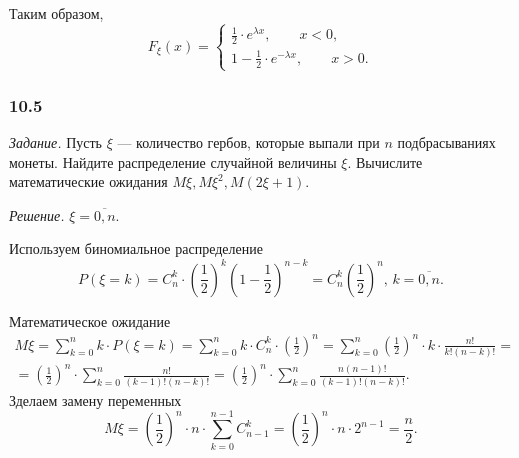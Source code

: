 Таким образом,
$$F_{ \xi } \left( x \right) =
\begin{cases}
\frac{1}{2} \cdot e^{ \lambda x}, \qquad x < 0, \\
1 - \frac{1}{2} \cdot e^{- \lambda x}, \qquad x > 0.
\end{cases}$$

\subsubsection*{10.5}

\textit{Задание.} Пусть $ \xi $ --- количество гербов, которые выпали при $n$ подбрасываниях монеты.
Найдите распределение случайной величины $ \xi $.
Вычислите математические ожидания $M \xi, M \xi^2, M \left( 2 \xi + 1 \right) $.

\textit{Решение.} $ \xi = \overline{0, n}$.

Используем биномиальное распределение
$$P \left( \xi = k \right) =
C_n^k \cdot \left( \frac{1}{2} \right)^k \left( 1 - \frac{1}{2} \right)^{n-k} =
C_n^k \left( \frac{1}{2} \right)^n, \,
k = \overline{0, n}.$$

Математическое ожидание
\begin{equation*}
\begin{split}
  M \xi =
  \sum \limits_{k=0}^n k \cdot P \left( \xi = k \right) =
  \sum \limits_{k=0}^n k \cdot C_n^k \cdot \left( \frac{1}{2} \right)^n =
  \sum \limits_{k=0}^n
    \left( \frac{1}{2} \right)^n \cdot k \cdot
    \frac{n!}{k! \left( n-k \right)!} = \\
  = \left( \frac{1}{2} \right)^n \cdot \sum \limits_{k=0}^n
    \frac{n!}{ \left( k - 1 \right)! \left( n - k \right)!} =
  \left( \frac{1}{2} \right)^n \cdot \sum \limits_{k=0}^n
    \frac{n \left( n-1 \right)!}{ \left( k-1 \right)! \left( n-k \right)!}.
\end{split}
\end{equation*}
Зделаем замену переменных
$$M \xi =
\left( \frac{1}{2} \right)^n \cdot n \cdot \sum \limits_{k=0}^{n-1} C_{n-1}^k =
\left( \frac{1}{2} \right)^n \cdot n \cdot 2^{n-1} =
\frac{n}{2}.$$

